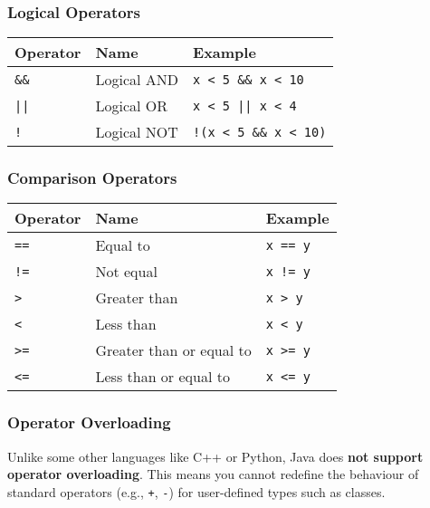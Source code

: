 \documentclass{article}
\begin{document}
\vspace{1em}
\subsubsection{Logical Operators}
\begin{center}
\begin{tabular}{@{}lll@{}}
\toprule
\textbf{Operator} & \textbf{Name} & \textbf{Example} \\
\midrule
\texttt{\&\&} & Logical AND & \texttt{x < 5 \&\& x < 10} \\
\texttt{||}  & Logical OR  & \texttt{x < 5 || x < 4} \\
\texttt{!}   & Logical NOT & \texttt{!(x < 5 \&\& x < 10)} \\
\bottomrule
\end{tabular}
\end{center}

\vspace{1em}
\subsubsection{Comparison Operators}
\begin{center}
\begin{tabular}{@{}lll@{}}
\toprule
\textbf{Operator} & \textbf{Name} & \textbf{Example} \\
\midrule
\texttt{==} & Equal to                 & \texttt{x == y} \\
\texttt{!=} & Not equal                & \texttt{x != y} \\
\texttt{>}  & Greater than             & \texttt{x > y} \\
\texttt{<}  & Less than                & \texttt{x < y} \\
\texttt{>=} & Greater than or equal to & \texttt{x >= y} \\
\texttt{<=} & Less than or equal to    & \texttt{x <= y} \\
\bottomrule
\end{tabular}
\end{center}

\subsubsection{Operator Overloading}

Unlike some other languages like C++ or Python, Java does \textbf{not support operator overloading}. This means you cannot redefine the behaviour of standard operators (e.g., \texttt{+}, \texttt{-}) for user-defined types such as classes.
\end{document}
